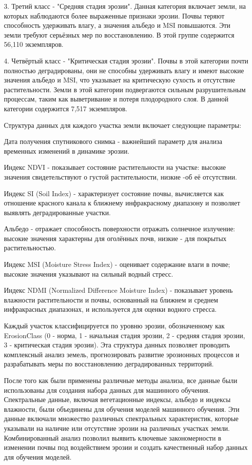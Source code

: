 \begin{multicols}{2}
3. Третий класс - "Средняя стадия эрозии". Данная категория включает
земли, на которых наблюдаются более выраженные признаки эрозии. Почвы
теряют способность удерживать влагу, а значения альбедо и MSI
повышаются. Эти земли требуют серьёзных мер по восстановлению. В этой
группе содержится 56,110 экземпляров.

4. Четвёртый класс - "Критическая стадия эрозии". Почвы в этой категории
почти полностью деградированы, они не способны удерживать влагу и
имеют высокие значения альбедо и MSI, что указывает на критическую
сухость и отсутствие растительности. Земли в этой категории
подвергаются сильным разрушительным процессам, таким как выветривание
и потеря плодородного слоя. В данной категории содержится 7,517
экземпляров.

Структура данных для каждого участка земли включает следующие параметры:

Дата получения спутникового снимка - важнейший параметр для анализа
временных изменений в динамике эрозии.

Индекс NDVI - показывает состояние растительности на участке: высокие
значения свидетельствуют о густой растительности, низкие -об её
отсутствии.

Индекс SI (Soil Index) - характеризует состояние почвы, вычисляется как
отношение красного канала к ближнему инфракрасному диапазону и позволяет
выявлять деградированные участки.

Альбедо - отражает способность поверхности отражать солнечное излучение:
высокие значения характерны для оголённых почв, низкие - для покрытых
растительностью.

Индекс MSI (Moisture Stress Index) - оценивает содержание влаги в почве;
высокие значения указывают на сильный водный стресс.

Индекс NDMI (Normalized Difference Moisture Index) - показывает уровень
влажности растительности и почвы, основанный на ближнем и среднем
инфракрасных диапазонах, и используется для оценки водного стресса.

Каждый участок классифицируется по уровню эрозии, обозначенному как
ErosionClass (0 - норма, 1 - начальная стадия эрозии, 2 - средняя стадия
эрозии, 3 - критическая стадия эрозии). Эта структура данных позволяет
проводить комплексный анализ земель, прогнозировать развитие эрозионных
процессов и разрабатывать меры по восстановлению деградированных
территорий.

После того как были применены различные методы анализа, все данные были
использованы для создания набора данных для машинного обучения.
Спектральные данные, включая вегетационные индексы, альбедо и индексы
влажности, были объединены для обучения моделей машинного обучения. Эти
данные включали множество различных спектральных характеристик, которые
указывали на наличие или отсутствие эрозии на различных участках земли.
Комбинированный анализ позволил выявить ключевые закономерности в
изменении почвы под воздействием эрозии и создать качественный набор
данных для обучения моделей.


\end{multicols}
